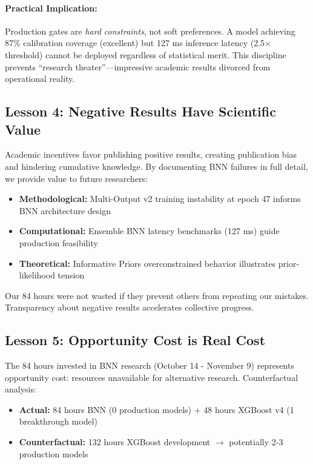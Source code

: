 \paragraph{Practical Implication:}
Production gates are \textit{hard constraints}, not soft preferences. A model achieving 87\% calibration coverage (excellent) but 127 ms inference latency (2.5$\times$ threshold) cannot be deployed regardless of statistical merit. This discipline prevents ``research theater''---impressive academic results divorced from operational reality.

\subsection{Lesson 4: Negative Results Have Scientific Value}

Academic incentives favor publishing positive results, creating publication bias and hindering cumulative knowledge. By documenting BNN failures in full detail, we provide value to future researchers:

\begin{itemize}[itemsep=2pt,parsep=0pt]
    \item \textbf{Methodological:} Multi-Output v2 training instability at epoch 47 informs BNN architecture design
    \item \textbf{Computational:} Ensemble BNN latency benchmarks (127 ms) guide production feasibility
    \item \textbf{Theoretical:} Informative Priors overconstrained behavior illustrates prior-likelihood tension
\end{itemize}

Our 84 hours were not wasted if they prevent others from repeating our mistakes. Transparency about negative results accelerates collective progress.

\subsection{Lesson 5: Opportunity Cost is Real Cost}

The 84 hours invested in BNN research (October 14 - November 9) represents opportunity cost: resources unavailable for alternative research. Counterfactual analysis:

\begin{itemize}[itemsep=2pt,parsep=0pt]
    \item \textbf{Actual:} 84 hours BNN (0 production models) + 48 hours XGBoost v4 (1 breakthrough model)
    \item \textbf{Counterfactual:} 132 hours XGBoost development $\to$ potentially 2-3 production models
\end{itemize}

